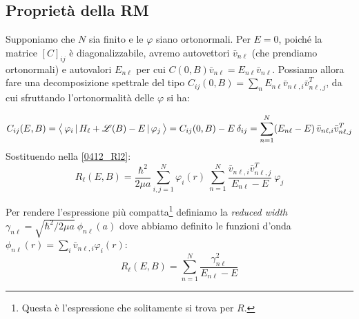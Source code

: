 \subsection{Proprietà della RM}
Supponiamo che $N$ sia finito e le $\varphi$ siano ortonormali. Per $E=0$, poiché la matrice $[C]_{ij}$ è diagonalizzabile, avremo autovettori $\bar{v}_{n\ell}$ (che prendiamo ortonormali) e autovalori $E_{n\ell}$ per cui $C(0,B)\bar{v}_{n\ell} = E_{n\ell} \bar{v}_{n\ell}$. Possiamo allora fare una decomposizione spettrale del tipo $C_{ij}(0,B) = \sum_n E_{n\ell} \bar{v}_{n\ell,i} \bar{v}^T_{n\ell,j}$, da cui sfruttando l'ortonormalità delle $\varphi$ si ha:

$$ C_{ij}(E,B) = \bigl\langle\, \varphi_i\, |\,H_\ell + \mathscr{L}(B) - E\, |\,\varphi_j\, \bigr\rangle = C_{ij}(0,B) - E\: \delta_{ij} = \sum_{n=1}^N (E_{n\ell} - E)\, \bar{v}_{n\ell,i}\bar{v}^T_{n\ell,j}$$
Sostituendo nella \eqref{0412_Rl2}:
$$R_\ell (E,B) = \frac{\hbar^2}{2\mu a} \sum_{i,j =1}^N \varphi_i(r) \: \sum_{n=1}^{N} \frac{\bar{v}_{n\ell,i}\bar{v}^T_{n\ell,j}}{E_{n\ell}-E} \: \varphi_j$$ 

\noindent Per rendere l'espressione più compatta\footnote{Questa è l'espressione che solitamente si trova per $R$.} definiamo la \textit{reduced width} $\gamma_{n\ell} = \sqrt{\hbar^2/2\mu a} \: \phi_{n\ell}(a)$ dove abbiamo definito le funzioni d'onda $\phi_{n\ell}(r) = \sum_i \bar{v}_{n\ell,i}\varphi_i(r)$:
\begin{equation}\label{0412_Rl3}
R_\ell (E,B) = \sum_{n=1}^N \frac{\gamma_{n\ell}^2}{E_{n\ell}-E}	
\end{equation}

